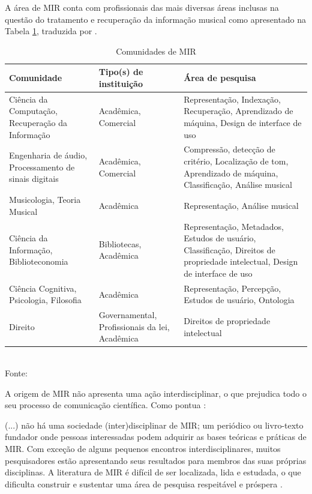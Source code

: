 A área de MIR conta com profissionais das mais diversas áreas inclusas na questão do tratamento e recuperação da informação musical como apresentado na Tabela \ref{tab:comunidadeMIR}, traduzida por .

\begin{table}[ht]
    \centering
    \caption{Comunidades de MIR}
    \begin{tabular}{p{4cm}|p{4cm}|p{4cm}}
    \hline
        Comunidade & Tipo(s) de instituição & Área de pesquisa \\
    \hline
        Ciência da Computação, Recuperação da Informação & Acadêmica, Comercial & Representação, Indexação, Recuperação, Aprendizado de máquina, Design de interface de uso \\
    \hline
        Engenharia de áudio, Processamento de sinais digitais & Acadêmica, Comercial & Compressão, detecção de critério, Localização de tom, Aprendizado de máquina, Classificação, Análise musical \\
    \hline
        Musicologia, Teoria Musical & Acadêmica & Representação, Análise musical \\
    \hline
        Ciência da Informação, Biblioteconomia & Bibliotecas, Acadêmica & Representação, Metadados, Estudos de usuário, Classificação, Direitos de propriedade intelectual, Design de interface de uso \\
    \hline
        Ciência Cognitiva, Psicologia, Filosofia & Acadêmica & Representação, Percepção, Estudos de usuário, Ontologia \\
    \hline
        Direito & Governamental, Profissionais da lei, Acadêmica & Direitos de propriedade intelectual \\
    \hline
    \end{tabular}
    \label{tab:comunidadeMIR}
    \\Fonte: 
\end{table}

A origem de MIR não apresenta uma ação interdisciplinar, o que prejudica todo o seu processo de comunicação científica. Como pontua :

\begin{citacao}
(...) não há uma sociedade (inter)disciplinar de MIR; um periódico ou livro-texto fundador onde pessoas interessadas podem adquirir as bases teóricas e práticas de MIR. Com exceção de alguns pequenos encontros interdisciplinares, muitos pesquisadores estão apresentando seus resultados para membros das suas próprias disciplinas. A literatura de MIR é difícil de ser localizada, lida e estudada, o que dificulta construir e sustentar uma área de pesquisa respeitável e próspera \cite{santini&souza2007}.
\end{citacao}

